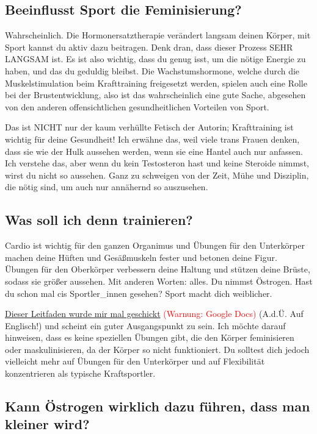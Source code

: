 \documentclass{article}
\begin{document}
\subsection{Beeinflusst Sport die Feminisierung?}

Wahrscheinlich. Die Hormonersatztherapie verändert langsam deinen Körper, mit Sport kannst du aktiv dazu beitragen. Denk dran, dass dieser Prozess SEHR LANGSAM ist. Es ist also wichtig, dass du genug isst, um die nötige Energie zu haben, und das du geduldig bleibst. Die Wachstumshormone, welche durch die Muskelstimulation beim Krafttraining freigesetzt werden, spielen auch eine Rolle bei der Brustentwicklung, also ist das wahrscheinlich eine gute Sache, abgesehen von den anderen offensichtlichen gesundheitlichen Vorteilen von Sport.

Das ist NICHT nur der kaum verhüllte Fetisch der Autorin; Krafttraining ist wichtig für deine Gesundheit! Ich erwähne das, weil viele trans Frauen denken, dass sie wie der Hulk aussehen werden, wenn sie eine Hantel auch nur anfassen. Ich verstehe das, aber wenn du kein Testosteron hast und keine Steroide nimmst, wirst du nicht so aussehen. Ganz zu schweigen von der Zeit, Mühe und Disziplin, die nötig sind, um auch nur annähernd so auszusehen.

\subsection{Was soll ich denn trainieren?}\label{11-16}

Cardio ist wichtig für den ganzen Organimus und Übungen für den Unterkörper machen deine Hüften und Gesäßmuskeln fester und betonen deine Figur. Übungen für den Oberkörper verbessern deine Haltung und stützen deine Brüste, sodass sie größer aussehen. Mit anderen Worten: alles. Du nimmst Östrogen. Hast du schon mal cis Sportler\_innen gesehen? Sport macht dich weiblicher.

\href{https://docs.google.com/document/d/1-NyE5EY5TTaRRMhk7HlTbKJ7HifjEsA4jlDO1qKQVl0/edit?tab=t.0}{Dieser Leitfaden wurde mir mal geschickt} \textcolor{red}{(Warnung: Google Docs)} (A.d.Ü. Auf Englisch!) und scheint ein guter Ausgangspunkt zu sein. Ich möchte darauf hinweisen, dass es keine speziellen Übungen gibt, die den Körper feminisieren oder maskulinisieren, da der Körper so nicht funktioniert. Du solltest dich jedoch vielleicht mehr auf Übungen für den Unterkörper und auf Flexibilität konzentrieren als typische Kraftsportler.

\subsection{Kann Östrogen wirklich dazu führen, dass man kleiner wird?}
\end{document}
